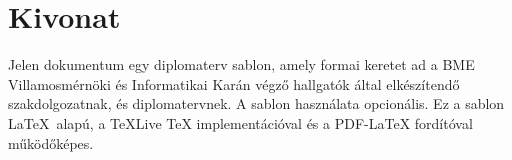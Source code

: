 \chapter*{Kivonat}

Jelen dokumentum egy diplomaterv sablon, amely formai keretet ad a BME Villamosmérnöki és Informatikai Karán végző hallgatók által elkészítendő szakdolgozatnak, és diplomatervnek. A sablon használata opcionális. Ez a sablon \LaTeX \  alapú, a TeXLive TeX 
implementációval és a PDF-LaTeX fordítóval működőképes.
